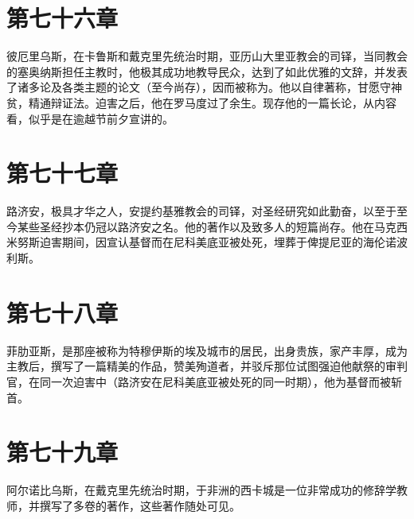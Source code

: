 
\section{第七十六章}

彼厄里乌斯，在卡鲁斯和戴克里先统治时期，亚历山大里亚教会的司铎，当同教会的塞奥纳斯担任主教时，他极其成功地教导民众，达到了如此优雅的文辞，并发表了诸多论及各类主题的论文（至今尚存），因而被称为。他以自律著称，甘愿守神贫，精通辩证法。迫害之后，他在罗马度过了余生。现存他的一篇长论，从内容看，似乎是在逾越节前夕宣讲的。\par


\section{第七十七章}

路济安，极具才华之人，安提约基雅教会的司铎，对圣经研究如此勤奋，以至于至今某些圣经抄本仍冠以路济安之名。他的著作以及致多人的短篇尚存。他在马克西米努斯迫害期间，因宣认基督而在尼科美底亚被处死，埋葬于俾提尼亚的海伦诺波利斯。\par


\section{第七十八章}

菲肋亚斯，是那座被称为特穆伊斯的埃及城市的居民，出身贵族，家产丰厚，成为主教后，撰写了一篇精美的作品，赞美殉道者，并驳斥那位试图强迫他献祭的审判官，在同一次迫害中（路济安在尼科美底亚被处死的同一时期），他为基督而被斩首。\par


\section{第七十九章}

阿尔诺比乌斯，在戴克里先统治时期，于非洲的西卡城是一位非常成功的修辞学教师，并撰写了多卷的著作，这些著作随处可见。\par


